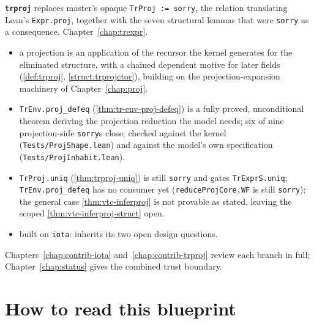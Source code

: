 \textbf{\texttt{trproj}} replaces master's opaque \texttt{TrProj := sorry}, the relation
translating Lean's \texttt{Expr.proj}, together with the seven structural lemmas that were
\texttt{sorry} as a consequence. Chapter~\ref{chap:trexpr}.
\begin{itemize}
\item {} a projection is an application of the recursor the kernel generates for the
eliminated structure, with a chained dependent motive for later fields (\ref{def:trproj},
\ref{struct:trprojctor}), building on the projection-expansion machinery of
Chapter~\ref{chap:proj}.
\item {} \texttt{TrEnv.proj\_defeq} (\ref{thm:tr-env-proj-defeq}) is a fully proved,
unconditional theorem deriving the projection reduction the model needs; six of nine
projection-side \texttt{sorry}s close; checked against the kernel (\texttt{Tests/ProjShape.lean})
and against the model's own specification (\texttt{Tests/ProjInhabit.lean}).
\item {} \texttt{TrProj.uniq} (\ref{thm:trproj-uniq}) is still \texttt{sorry} and gates
\texttt{TrExprS.uniq}; \texttt{TrEnv.proj\_defeq} has no consumer yet
(\texttt{reduceProjCore.WF} is still \texttt{sorry}); the general case
\ref{thm:vtc-inferproj} is not provable as stated, leaving the scoped
\ref{thm:vtc-inferproj-struct} open.
\item {} built on \texttt{iota}: inherits its two open design questions.
\end{itemize}

Chapters~\ref{chap:contrib-iota} and~\ref{chap:contrib-trproj} review each branch in full;
Chapter~\ref{chap:status} gives the combined trust boundary.

\section{How to read this blueprint}

